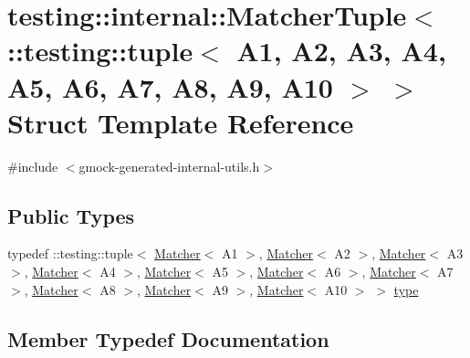 \hypertarget{structtesting_1_1internal_1_1_matcher_tuple_3_01_1_1testing_1_1tuple_3_01_a1_00_01_a2_00_01_a3_0842d32b3c1d00aa4e42fe38fbc4fa689}{}\section{testing\+:\+:internal\+:\+:Matcher\+Tuple$<$ \+:\+:testing\+:\+:tuple$<$ A1, A2, A3, A4, A5, A6, A7, A8, A9, A10 $>$ $>$ Struct Template Reference}
\label{structtesting_1_1internal_1_1_matcher_tuple_3_01_1_1testing_1_1tuple_3_01_a1_00_01_a2_00_01_a3_0842d32b3c1d00aa4e42fe38fbc4fa689}


{\ttfamily \#include $<$gmock-\/generated-\/internal-\/utils.\+h$>$}

\subsection*{Public Types}
\begin{DoxyCompactItemize}
\item 
typedef \+::testing\+::tuple$<$ \hyperlink{classtesting_1_1_matcher}{Matcher}$<$ A1 $>$, \hyperlink{classtesting_1_1_matcher}{Matcher}$<$ A2 $>$, \hyperlink{classtesting_1_1_matcher}{Matcher}$<$ A3 $>$, \hyperlink{classtesting_1_1_matcher}{Matcher}$<$ A4 $>$, \hyperlink{classtesting_1_1_matcher}{Matcher}$<$ A5 $>$, \hyperlink{classtesting_1_1_matcher}{Matcher}$<$ A6 $>$, \hyperlink{classtesting_1_1_matcher}{Matcher}$<$ A7 $>$, \hyperlink{classtesting_1_1_matcher}{Matcher}$<$ A8 $>$, \hyperlink{classtesting_1_1_matcher}{Matcher}$<$ A9 $>$, \hyperlink{classtesting_1_1_matcher}{Matcher}$<$ A10 $>$ $>$ \hyperlink{structtesting_1_1internal_1_1_matcher_tuple_3_01_1_1testing_1_1tuple_3_01_a1_00_01_a2_00_01_a3_0842d32b3c1d00aa4e42fe38fbc4fa689_ad8f6e383d160062fe6ccf40a839fdd31}{type}
\end{DoxyCompactItemize}


\subsection{Member Typedef Documentation}
\mbox{\label{structtesting_1_1internal_1_1_matcher_tuple_3_01_1_1testing_1_1tuple_3_01_a1_00_01_a2_00_01_a3_0842d32b3c1d00aa4e42fe38fbc4fa689_ad8f6e383d160062fe6ccf40a839fdd31}} 
